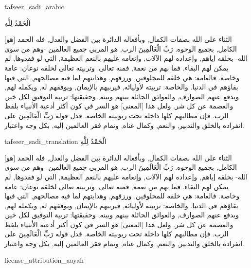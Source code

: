 \begin{taggedblock}{tafseer_sadi_arabic}
\begin{Arabic}
{ الْحَمْدُ لِلَّهِ }

[هو]
الثناء على الله بصفات الكمال, وبأفعاله الدائرة بين الفضل والعدل, فله الحمد الكامل, بجميع الوجوه.
{ رَبِّ الْعَالَمِينَ }
الرب, هو المربي جميع العالمين -وهم من سوى الله- بخلقه إياهم, وإعداده لهم الآلات, وإنعامه عليهم بالنعم العظيمة, التي لو فقدوها, لم يمكن لهم البقاء. فما بهم من نعمة, فمنه تعالى. وتربيته تعالى لخلقه نوعان: عامة وخاصة. فالعامة: هي خلقه للمخلوقين, ورزقهم, وهدايتهم لما فيه مصالحهم, التي فيها بقاؤهم في الدنيا. والخاصة: تربيته لأوليائه, فيربيهم بالإيمان, ويوفقهم له, ويكمله لهم, ويدفع عنهم الصوارف, والعوائق الحائلة بينهم وبينه, وحقيقتها: تربية التوفيق لكل خير, والعصمة عن كل شر. ولعل هذا
[المعنى]
هو السر في كون أكثر أدعية الأنبياء بلفظ الرب. فإن مطالبهم كلها داخلة تحت ربوبيته الخاصة. فدل قوله
{ رَبِّ الْعَالَمِينَ }
على انفراده بالخلق والتدبير, والنعم, وكمال غناه, وتمام فقر العالمين إليه, بكل وجه واعتبار.
\end{Arabic}
\end{taggedblock}
\begin{taggedblock}{tafseer_sadi_translation}
{ الْحَمْدُ لِلَّهِ }

[هو]
الثناء على الله بصفات الكمال, وبأفعاله الدائرة بين الفضل والعدل, فله الحمد الكامل, بجميع الوجوه.
{ رَبِّ الْعَالَمِينَ }
الرب, هو المربي جميع العالمين -وهم من سوى الله- بخلقه إياهم, وإعداده لهم الآلات, وإنعامه عليهم بالنعم العظيمة, التي لو فقدوها, لم يمكن لهم البقاء. فما بهم من نعمة, فمنه تعالى. وتربيته تعالى لخلقه نوعان: عامة وخاصة. فالعامة: هي خلقه للمخلوقين, ورزقهم, وهدايتهم لما فيه مصالحهم, التي فيها بقاؤهم في الدنيا. والخاصة: تربيته لأوليائه, فيربيهم بالإيمان, ويوفقهم له, ويكمله لهم, ويدفع عنهم الصوارف, والعوائق الحائلة بينهم وبينه, وحقيقتها: تربية التوفيق لكل خير, والعصمة عن كل شر. ولعل هذا
[المعنى]
هو السر في كون أكثر أدعية الأنبياء بلفظ الرب. فإن مطالبهم كلها داخلة تحت ربوبيته الخاصة. فدل قوله
{ رَبِّ الْعَالَمِينَ }
على انفراده بالخلق والتدبير, والنعم, وكمال غناه, وتمام فقر العالمين إليه, بكل وجه واعتبار.
\end{taggedblock}
\begin{taggedblock}{license_attribution_aayah}

\end{taggedblock}
\begin{comment}
Please use the following for footnotes:- Sample\footnoteQ{Text of Qur'an footnote goes here.}.
Sample\footnoteT{Text of Tafseer footnote goes here.}.
\end{comment}